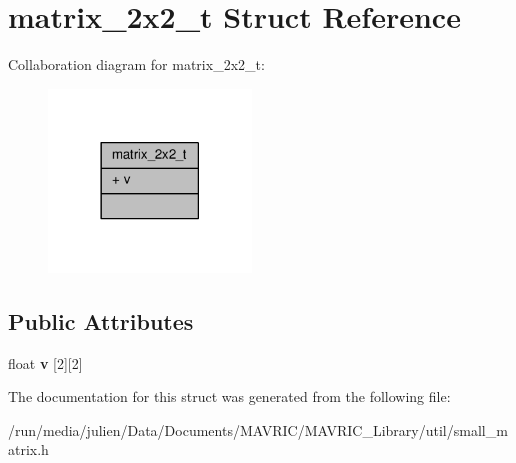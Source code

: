\hypertarget{structmatrix__2x2__t}{\section{matrix\+\_\+2x2\+\_\+t Struct Reference}
\label{structmatrix__2x2__t}
}


Collaboration diagram for matrix\+\_\+2x2\+\_\+t\+:
\nopagebreak
\begin{figure}[H]
\begin{center}
\leavevmode
\includegraphics[width=153pt]{structmatrix__2x2__t__coll__graph}
\end{center}
\end{figure}
\subsection*{Public Attributes}
\begin{DoxyCompactItemize}
\item 
\hypertarget{structmatrix__2x2__t_ad838860863027a71e70aa1823fdbd26b}{float {\bfseries v} \mbox{[}2\mbox{]}\mbox{[}2\mbox{]}}\label{structmatrix__2x2__t_ad838860863027a71e70aa1823fdbd26b}

\end{DoxyCompactItemize}


The documentation for this struct was generated from the following file\+:\begin{DoxyCompactItemize}
\item 
/run/media/julien/\+Data/\+Documents/\+M\+A\+V\+R\+I\+C/\+M\+A\+V\+R\+I\+C\+\_\+\+Library/util/small\+\_\+matrix.\+h\end{DoxyCompactItemize}
